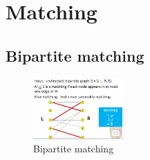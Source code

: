 \newpage

\section{Matching}
\subsection{Bipartite matching}
\begin{figure}[H]
    \centering
    \includegraphics[width=0.309\textwidth]{pic/DAA10/Bipartite matching}
    \caption{Bipartite matching}
\end{figure}

